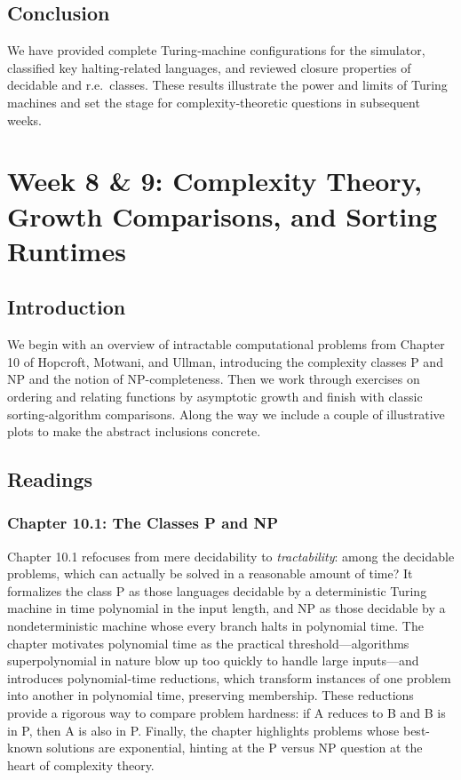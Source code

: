 \documentclass{article}
\theoremstyle{theorem}
\theoremstyle{definition}
\theoremstyle{remark}
\begin{document}
\subsection{Conclusion}

We have provided complete Turing‐machine configurations for the simulator, classified key halting‐related languages, and reviewed closure properties of decidable and r.e.\ classes.  These results illustrate the power and limits of Turing machines and set the stage for complexity‐theoretic questions in subsequent weeks.

\newpage

\section{Week 8 \& 9: Complexity Theory, Growth Comparisons, and Sorting Runtimes}

\subsection{Introduction}
We begin with an overview of intractable computational problems from Chapter 10 of Hopcroft, Motwani, and Ullman, introducing the complexity classes P and NP and the notion of NP-completeness. Then we work through exercises on ordering and relating functions by asymptotic growth and finish with classic sorting-algorithm comparisons. Along the way we include a couple of illustrative plots to make the abstract inclusions concrete.

\subsection{Readings}
\subsubsection*{Chapter 10.1: The Classes P and NP}
Chapter 10.1 refocuses from mere decidability to \emph{tractability}: among the decidable problems, which can actually be solved in a reasonable amount of time? It formalizes the class P as those languages decidable by a deterministic Turing machine in time polynomial in the input length, and NP as those decidable by a nondeterministic machine whose every branch halts in polynomial time. The chapter motivates polynomial time as the practical threshold—algorithms superpolynomial in nature blow up too quickly to handle large inputs—and introduces polynomial-time reductions, which transform instances of one problem into another in polynomial time, preserving membership. These reductions provide a rigorous way to compare problem hardness: if A reduces to B and B is in P, then A is also in P. Finally, the chapter highlights problems whose best-known solutions are exponential, hinting at the P versus NP question at the heart of complexity theory.
\end{document}
